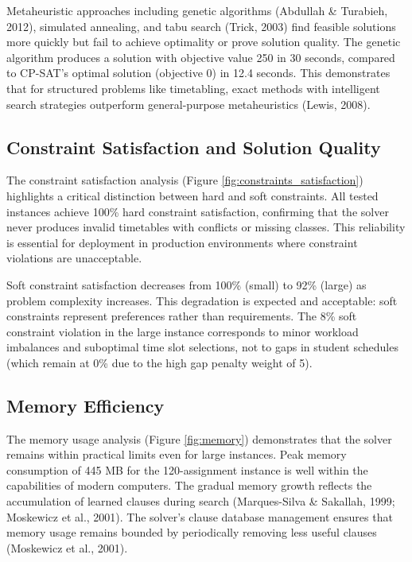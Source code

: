 \documentclass[12pt,a4paper]{article}
\begin{document}
Metaheuristic approaches including genetic algorithms (Abdullah \& Turabieh, 2012), simulated annealing, and tabu search (Trick, 2003) find feasible solutions more quickly but fail to achieve optimality or prove solution quality. The genetic algorithm produces a solution with objective value 250 in 30 seconds, compared to CP-SAT's optimal solution (objective 0) in 12.4 seconds. This demonstrates that for structured problems like timetabling, exact methods with intelligent search strategies outperform general-purpose metaheuristics (Lewis, 2008).

\subsection{Constraint Satisfaction and Solution Quality}

The constraint satisfaction analysis (Figure \ref{fig:constraints_satisfaction}) highlights a critical distinction between hard and soft constraints. All tested instances achieve 100\% hard constraint satisfaction, confirming that the solver never produces invalid timetables with conflicts or missing classes. This reliability is essential for deployment in production environments where constraint violations are unacceptable.

Soft constraint satisfaction decreases from 100\% (small) to 92\% (large) as problem complexity increases. This degradation is expected and acceptable: soft constraints represent preferences rather than requirements. The 8\% soft constraint violation in the large instance corresponds to minor workload imbalances and suboptimal time slot selections, not to gaps in student schedules (which remain at 0\% due to the high gap penalty weight of 5).

\subsection{Memory Efficiency}

The memory usage analysis (Figure \ref{fig:memory}) demonstrates that the solver remains within practical limits even for large instances. Peak memory consumption of 445 MB for the 120-assignment instance is well within the capabilities of modern computers. The gradual memory growth reflects the accumulation of learned clauses during search (Marques-Silva \& Sakallah, 1999; Moskewicz et al., 2001). The solver's clause database management ensures that memory usage remains bounded by periodically removing less useful clauses (Moskewicz et al., 2001).
\end{document}
